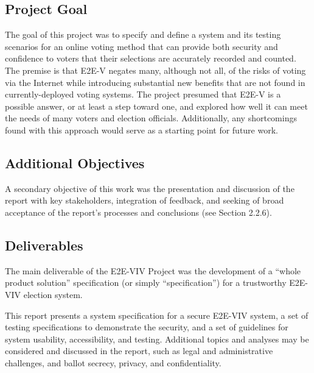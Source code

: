 \subsection{Project Goal}
\label{sec:project-goal}

The goal of this project was to specify and define a system and its
testing scenarios for an online voting method that can provide both
security and confidence to voters that their selections are accurately
recorded and counted. The premise is that E2E-V negates many, although 
not all, of the risks of voting via the Internet while introducing 
substantial new benefits that are not found in currently-deployed voting 
systems. The project presumed that E2E-V is a possible answer, or at least 
a step toward one, and explored how well it can meet the needs of many voters 
and election officials. Additionally, any shortcomings found with this approach
would serve as a starting point for future work.

\subsection{Additional Objectives}
\label{sec:addit-object}

A secondary objective of this work was the presentation and discussion
of the report with key stakeholders, integration of feedback, and
seeking of broad acceptance of the report's processes and conclusions
(see Section 2.2.6).

\subsection{Deliverables}
\label{sec:deliverables}

The main deliverable of the E2E-VIV Project was the development of a
``whole product solution'' specification (or simply ``specification'')
for a trustworthy E2E-VIV election system.

This report presents a system specification for a secure E2E-VIV
system, a set of testing specifications to demonstrate the security,
and a set of guidelines for system usability, accessibility, and
testing. Additional topics and analyses may be considered and
discussed in the report, such as legal and administrative challenges,
and ballot secrecy, privacy, and confidentiality.

